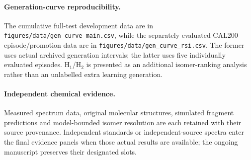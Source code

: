 \paragraph{Generation-curve reproducibility.}
The cumulative full-test development data are in
\texttt{figures/data/gen\_curve\_main.csv}, while the
separately evaluated CAL200 episode/promotion data are in
\texttt{figures/data/gen\_curve\_rsi.csv}.
The former uses actual archived generation intervals; the latter
uses five individually evaluated episodes. H$_1$/H$_2$ is
presented as an additional isomer-ranking analysis rather than an
unlabelled extra learning generation.

\paragraph{Independent chemical evidence.}
Measured spectrum data, original molecular structures, simulated fragment
predictions and model-bounded isomer resolution are each retained with
their source provenance. Independent standards or independent-source
spectra enter the final evidence panels when those actual results are
available; the ongoing manuscript preserves their designated slots.
